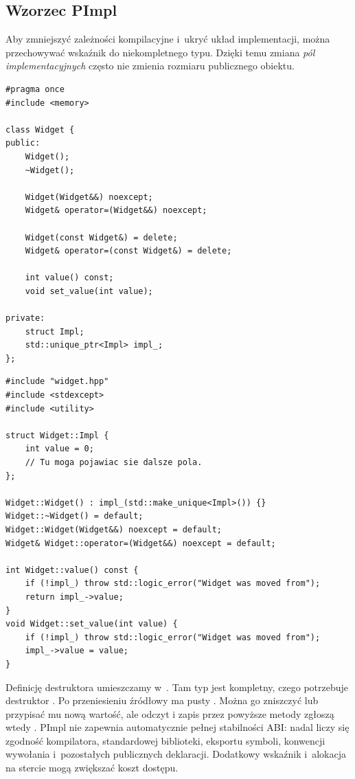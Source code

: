 \subsection{Wzorzec PImpl}

Aby zmniejszyć zależności kompilacyjne i~ukryć układ implementacji,
można przechowywać wskaźnik do niekompletnego typu. Dzięki temu
zmiana \emph{pól implementacyjnych} często nie zmienia rozmiaru
publicznego obiektu.

\begin{lstlisting}[caption={PImpl: plik widget.hpp.}]
#pragma once
#include <memory>

class Widget {
public:
    Widget();
    ~Widget();

    Widget(Widget&&) noexcept;
    Widget& operator=(Widget&&) noexcept;

    Widget(const Widget&) = delete;
    Widget& operator=(const Widget&) = delete;

    int value() const;
    void set_value(int value);

private:
    struct Impl;
    std::unique_ptr<Impl> impl_;
};
\end{lstlisting}

\begin{lstlisting}[caption={PImpl: plik widget.cpp.}]
#include "widget.hpp"
#include <stdexcept>
#include <utility>

struct Widget::Impl {
    int value = 0;
    // Tu moga pojawiac sie dalsze pola.
};

Widget::Widget() : impl_(std::make_unique<Impl>()) {}
Widget::~Widget() = default;
Widget::Widget(Widget&&) noexcept = default;
Widget& Widget::operator=(Widget&&) noexcept = default;

int Widget::value() const {
    if (!impl_) throw std::logic_error("Widget was moved from");
    return impl_->value;
}
void Widget::set_value(int value) {
    if (!impl_) throw std::logic_error("Widget was moved from");
    impl_->value = value;
}
\end{lstlisting}

Definicję destruktora umieszczamy w~. Tam typ
 jest kompletny, czego potrzebuje destruktor
.
Po przeniesieniu źródłowy  ma pusty .
Można go zniszczyć lub przypisać mu nową wartość, ale odczyt i zapis
przez powyższe metody zgłoszą wtedy .
PImpl nie zapewnia automatycznie pełnej stabilności ABI: nadal
liczy się zgodność kompilatora, standardowej biblioteki, eksportu
symboli, konwencji wywołania i~pozostałych publicznych deklaracji.
Dodatkowy wskaźnik i~alokacja na stercie mogą zwiększać koszt dostępu.

